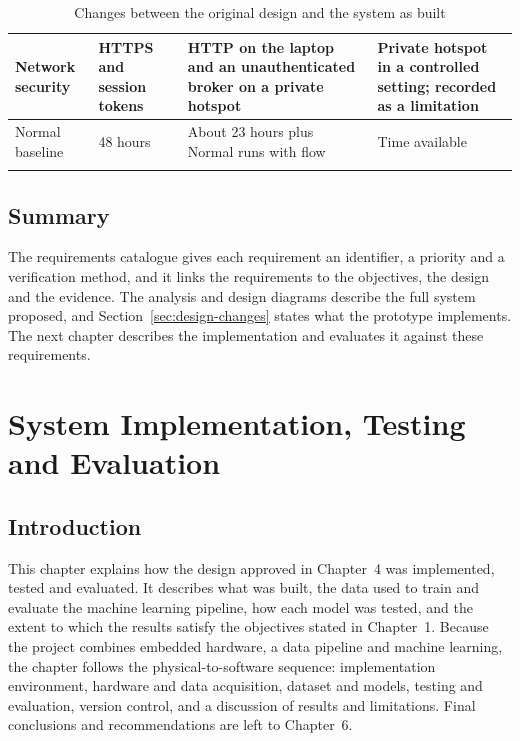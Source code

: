 \documentclass[12pt, a4paper]{article}
\begin{document}
\begin{longtable}{|p{2.8cm}|p{3.6cm}|p{3.7cm}|p{3.0cm}|}
\hline
Network security & HTTPS and session tokens & HTTP on the laptop and an unauthenticated broker on a private hotspot & Private hotspot in a controlled setting; recorded as a limitation \\
\hline
Normal baseline & 48 hours & About 23 hours plus Normal runs with flow & Time available \\
\hline
\caption{Changes between the original design and the system as built}\label{tab:design-changes}\\
\end{longtable}

\subsection{Summary}

The requirements catalogue gives each requirement an identifier, a priority and a verification method, and it links the requirements to the objectives, the design and the evidence. The analysis and design diagrams describe the full system proposed, and Section~\ref{sec:design-changes} states what the prototype implements. The next chapter describes the implementation and evaluates it against these requirements.

\clearpage

\renewcommand{\arraystretch}{1.45}
\setlength{\tabcolsep}{7pt}
\section{System Implementation, Testing and Evaluation}
\label{ch:implementation}

\subsection{Introduction}

This chapter explains how the design approved in Chapter~4 was implemented, tested and evaluated. It describes what was built, the data used to train and evaluate the machine learning pipeline, how each model was tested, and the extent to which the results satisfy the objectives stated in Chapter~1. Because the project combines embedded hardware, a data pipeline and machine learning, the chapter follows the physical-to-software sequence: implementation environment, hardware and data acquisition, dataset and models, testing and evaluation, version control, and a discussion of results and limitations. Final conclusions and recommendations are left to Chapter~6.
\end{document}
